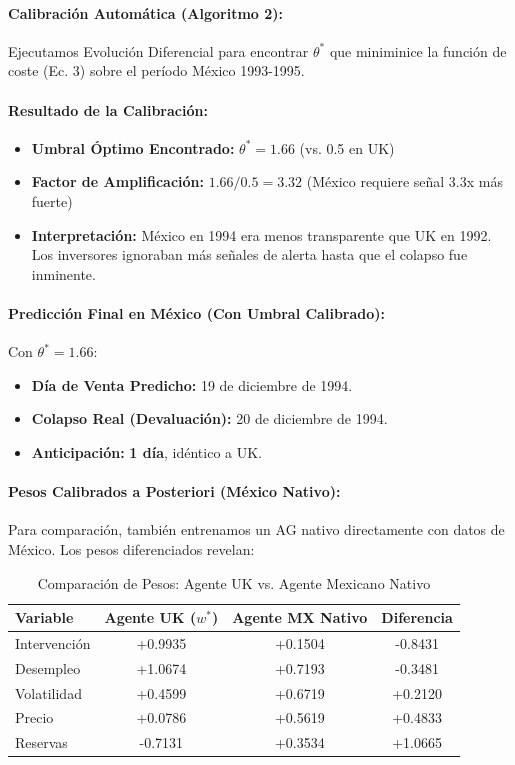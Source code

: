 \paragraph{Calibración Automática (Algoritmo 2):}
Ejecutamos Evolución Diferencial para encontrar $\theta^*$ que miniminice la función de coste (Ec. 3) sobre el período México 1993-1995.

\paragraph{Resultado de la Calibración:}
\begin{itemize}
    \item \textbf{Umbral Óptimo Encontrado:} $\theta^* = 1.66$ (vs. 0.5 en UK)
    \item \textbf{Factor de Amplificación:} $1.66 / 0.5 = 3.32$ (México requiere señal 3.3x más fuerte)
    \item \textbf{Interpretación:} México en 1994 era menos transparente que UK en 1992. Los inversores ignoraban más señales de alerta hasta que el colapso fue inminente.
\end{itemize}

\paragraph{Predicción Final en México (Con Umbral Calibrado):}
Con $\theta^* = 1.66$:
\begin{itemize}
    \item \textbf{Día de Venta Predicho:} 19 de diciembre de 1994.
    \item \textbf{Colapso Real (Devaluación):} 20 de diciembre de 1994.
    \item \textbf{Anticipación:} \textbf{1 día}, idéntico a UK.
\end{itemize}

\paragraph{Pesos Calibrados a Posteriori (México Nativo):}
Para comparación, también entrenamos un AG nativo directamente con datos de México. Los pesos diferenciados revelan:

\begin{table}[H]
\centering
\caption{Comparación de Pesos: Agente UK vs. Agente Mexicano Nativo}
\begin{tabular}{lccc}
\toprule
Variable & Agente UK ($w^*$) & Agente MX Nativo & Diferencia \\
\midrule
Intervención & +0.9935 & +0.1504 & -0.8431 \\
Desempleo & +1.0674 & +0.7193 & -0.3481 \\
Volatilidad & +0.4599 & +0.6719 & +0.2120 \\
Precio & +0.0786 & +0.5619 & +0.4833 \\
Reservas & -0.7131 & +0.3534 & +1.0665 \\
\bottomrule
\end{tabular}
\end{table}

